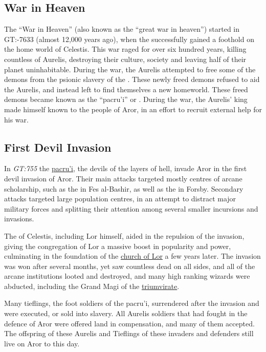 \subsection{War in Heaven}
\label{sec:War in Heaven}

The ``War in Heaven'' (also known as the ``great war in heaven'') started in
GT:-7633 (almost 12,000 years ago), when the  successfully
gained a foothold on the  home world of Celestis. This war
raged for over six hundred years, killing countless of Aurelis, destroying their
culture, society and leaving half of their planet uninhabitable. During the war,
the Aurelis attempted to free some of the demons from the psionic slavery of the
. These newly freed demons refused to aid the Aurelis, and
instead left to find themselves a new homeworld. These freed demons became known
as the ``pacru'i'' or . During the war, the Aurelis' king
 made himself known to the people of Aror, in an effort to
recruit external help for his war.

\subsection{First Devil Invasion}
\label{sec:First Devil Invasion}

In \emph{GT:755} the \hyperref[sec:Devils]{pacru'i}, the devils of the layers
of hell, invade Aror in the first devil invasion of Aror. Their main attacks
targeted mostly centres of arcane scholarship, such as the  in Fes al-Bashir, as well as the  in Forsby. Secondary attacks targeted large population centres, in
an attempt to distract major military forces and splitting their attention
among several smaller incursions and invasions.

The  of Celestis, including Lor himself, aided in the
repulsion of the invasion, giving the congregation of Lor a massive boost in
popularity and power, culminating in the foundation of the
\hyperref[sec:Knight Order of Tavos]{church of Lor} a few years later. The
invasion was won after several months, yet saw countless dead on all sides,
and all of the arcane institutions looted and destroyed, and many high ranking
wizards were abducted, including the Grand Magi of the
\hyperref[sec:Triumvirate]{triumvirate}.

Many tieflings, the foot soldiers of the pacru'i, surrendered after the
invasion and were executed, or sold into slavery. All Aurelis soldiers that
had fought in the defence of Aror were offered land in compensation, and many
of them accepted. The offspring of these Aurelis and Tieflings of these
invaders and defenders still live on Aror to this day.

